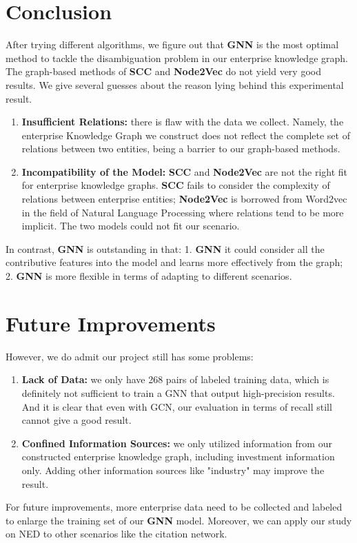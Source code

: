 \documentclass[sigconf, nonacm]{acmart}
\begin{document}
\section{Conclusion}
After trying different algorithms, we figure out that \textbf{GNN} is the most optimal method to tackle the disambiguation problem in our enterprise knowledge graph. The graph-based methods of \textbf{SCC} and \textbf{Node2Vec} do not yield very good results. We give several guesses about the reason lying behind this experimental result.
\begin{enumerate}
    \item \textbf{Insufficient Relations: } there is flaw with the data we collect. Namely, the enterprise Knowledge Graph we construct does not reflect the complete set of relations between two entities, being a barrier to our graph-based methods.
    \item \textbf{Incompatibility of the Model: } \textbf{SCC} and \textbf{Node2Vec} are not the right fit for enterprise knowledge graphs. \textbf{SCC} fails to consider the complexity of relations between enterprise entities; \textbf{Node2Vec} is borrowed from Word2vec in the field of Natural Language Processing where relations tend to be more implicit. The two models could not fit our scenario.
\end{enumerate}
In contrast, \textbf{GNN} is outstanding in that: 1. \textbf{GNN} it could consider all the contributive features into the model and learns more effectively from the graph; 2. \textbf{GNN} is more flexible in terms of adapting to different scenarios. 
\section{Future Improvements}
However, we do admit our project still has some problems:
\begin{enumerate}
    \item \textbf{Lack of Data: } we only have 268 pairs of labeled training data, which is definitely not sufficient to train a GNN that output high-precision results. And it is clear that even with GCN, our evaluation in terms of recall still cannot give a good result.   
    \item \textbf{Confined Information Sources: } we only utilized information from our constructed enterprise knowledge graph, including investment information only. Adding other information sources like "industry" may improve the result. 
\end{enumerate}
For future improvements, more enterprise data need to be collected and labeled to enlarge the training set of our \textbf{GNN} model. Moreover, we can apply our study on NED to other scenarios like the citation network.
\end{document}
